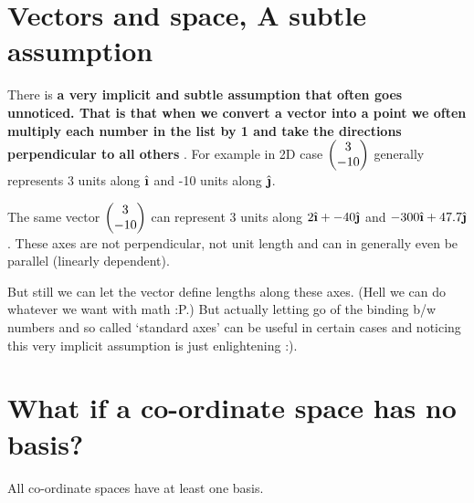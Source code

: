 \documentclass[../main.tex]{subfiles}
\begin{document}
\section{Vectors and space, A subtle assumption}
There is \textbf{a very implicit and subtle assumption that often goes unnoticed. That is that when we convert a vector into a point we often multiply each number in the list by 1 and take the directions perpendicular to all others} . For example in 2D case $ \blockcomment{Column-Vector: 3, -10} \begin{pmatrix} 3 \\  -10 \end{pmatrix} $ generally represents 3 units along $ \ihat $ and -10 units along $ \jhat $.

The same vector $ \blockcomment{Column-Vector: 3, -10} \begin{pmatrix} 3 \\  -10 \end{pmatrix} $ can represent 3 units along $ 2\ihat + -40\jhat $ and $ -300\ihat + 47.7\jhat $. These axes are not perpendicular, not unit length and can in generally even be parallel (linearly dependent).

But still we can let the vector define lengths along these axes. (Hell we can do whatever we want with math :P.) But actually letting go of the binding b/w numbers and so called `standard axes' can be useful in certain cases and noticing this very implicit assumption is just enlightening :).

\section{What if a co-ordinate space has no basis?}
\begin{theorem}
All co-ordinate spaces have at least one basis.
\end{theorem}
\end{document}

